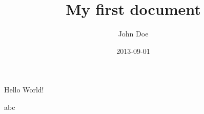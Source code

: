 \documentclass{article}
\title{My first document}
\date{2013-09-01}
\author{John Doe}
\begin{document}
  \maketitle
  \newpage

  Hello World!
   \newpage
 
   abc
\end{document}
